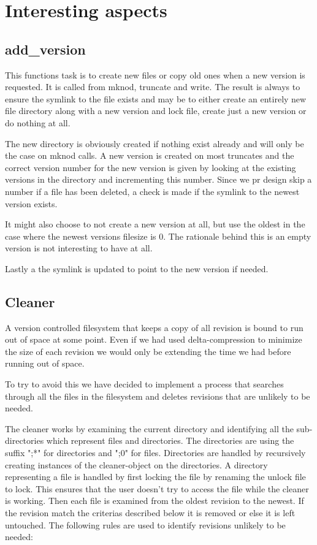 \documentclass[12pt]{article}
\begin{document}
\section{Interesting aspects}

\subsection{add\_version}

This functions task is to create new files or copy old ones when a new
version is requested. It is called from mknod, truncate and write. The
result is always to ensure the symlink to the file exists and may be
to either create an entirely new file directory along with a new
version and lock file, create just a new version or do nothing at all.

The new directory is obviously created if nothing exist already and
will only be the case on mknod calls. A new version is created on most
truncates and the correct version number for the new version is given
by looking at the existing versions in the directory and incrementing
this number. Since we pr design skip a number if a file has been
deleted, a check is made if the symlink to the newest version exists.

It might also choose to not create a new version at all, but use the
oldest in the case where the newest versions filesize is 0. The
rationale behind this is an empty version is not interesting to have
at all.

Lastly a the symlink is updated to point to the new version if needed.

\subsection{Cleaner}

A version controlled filesystem that keeps a copy of all revision is bound to
run out of space at some point. Even if we had used delta-compression to
minimize the size of each revision we would only be extending the time we had
before running out of space.

To try to avoid this we have decided to implement a process that searches
through all the files in the filesystem and deletes revisions that are unlikely
to be needed.

The cleaner works by examining the current directory and identifying all the 
sub-directories which represent files and directories. The directories are using the suffix ";*"
for directories and ";0" for files.
Directories are handled by recursively creating instances of the cleaner-object
on the directories.
A directory representing a file is handled by first locking the file by renaming
the unlock file to lock. This ensures that the user doesn't try to access the
file while the cleaner is working.
Then each file is examined from the oldest revision to the newest. If the
revision match the criterias described below it is removed or else it is left
untouched.
The following rules are used to identify revisions unlikely to be needed:
\end{document}
